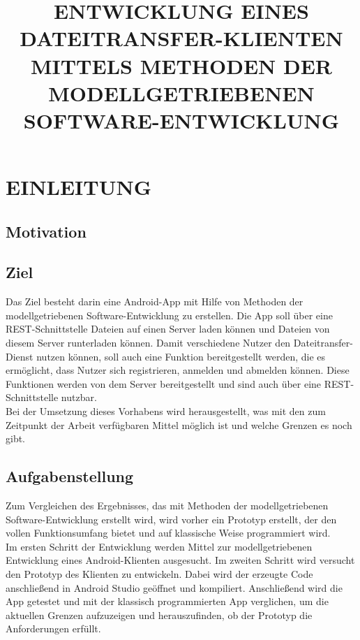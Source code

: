 \documentclass[a4paper,twoside]{article}
\begin{document}
\title{\uppercase{Entwicklung eines Dateitransfer-Klienten mittels Methoden der modellgetriebenen Software-entwicklung}}

\author{
}



\onecolumn \maketitle \normalsize \vfill

\section{\uppercase{Einleitung}}
\label{sec:introduction}

\subsection{Motivation}

\subsection{Ziel}
Das Ziel besteht darin eine Android-App mit Hilfe von Methoden der modellgetriebenen Software-Entwicklung zu erstellen. Die App soll \"uber eine REST-Schnittstelle Dateien auf einen Server
laden k\"onnen und Dateien von diesem Server runterladen k\"onnen. Damit verschiedene Nutzer den Dateitransfer-Dienst nutzen k\"onnen, soll auch eine Funktion bereitgestellt werden, die es erm\"oglicht, dass Nutzer sich registrieren, anmelden und abmelden k\"onnen. Diese Funktionen werden von dem Server bereitgestellt und sind auch \"uber eine REST-Schnittstelle nutzbar.\\
Bei der Umsetzung dieses Vorhabens wird herausgestellt, was mit den zum Zeitpunkt der Arbeit verf\"ugbaren Mittel m\"oglich ist und welche Grenzen es noch gibt.

\subsection{Aufgabenstellung}
Zum Vergleichen des Ergebnisses, das mit Methoden der modellgetriebenen Software-Entwicklung erstellt wird, wird vorher ein Prototyp erstellt, der den vollen Funktionsumfang bietet und auf klassische Weise programmiert wird.\\
Im ersten Schritt der Entwicklung werden Mittel zur modellgetriebenen Entwicklung eines Android-Klienten ausgesucht. Im zweiten Schritt wird versucht den Prototyp des Klienten zu entwickeln. Dabei wird der erzeugte Code anschlie\ss{}end in Android Studio ge\"offnet und kompiliert. Anschlie\ss{}end wird die App getestet und mit der klassisch programmierten App verglichen, um die aktuellen Grenzen aufzuzeigen und herauszufinden, ob der Prototyp die Anforderungen erf\"ullt.
\end{document}
